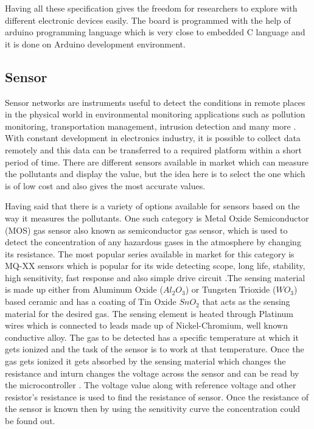 Having all these specification gives the freedom for researchers to explore with different electronic devices easily. The board is programmed with the help of arduino programming language which is very close to embedded C language and it is done on Arduino development environment. 

\subsection{Sensor}

Sensor networks are instruments useful to detect the conditions in remote places in the physical world in environmental monitoring applications such as pollution monitoring, transportation management, intrusion detection and many more \cite{Jung2011}. With constant development in electronics industry, it is possible to collect data remotely and this data can be transferred to a required platform within a short period of time.
There are different sensors available in market which can measure the pollutants and display the value, but the idea here is to select the one which is of low cost and also gives the most accurate values.
\par
Having said that there is a variety of options available for sensors based on the way it measures the pollutants. One such category is Metal Oxide Semiconductor (MOS) gas sensor also known as semiconductor gas sensor, which is used to detect the concentration of any hazardous gases in the atmosphere by changing its resistance. The most popular series available in market for this category is MQ-XX sensors which is popular for its wide detecting scope, long life, stability, high sensitivity, fast response and also simple drive circuit \cite{Data2012}.The sensing material is made up either from Aluminum Oxide ($ Al_{2}O_{3}$) or Tungsten Trioxide ($WO_3$) based ceramic and has a coating of Tin Oxide $ SnO_{2} $ that acts as the sensing material for the desired gas. The sensing element is heated through Platinum wires which is connected to leads made up of Nickel-Chromium, well known conductive alloy. The gas to be detected has a specific temperature at which it gets ionized and the task of the sensor is to work at that temperature. Once the gas gets ionized it gets absorbed by the sensing material which changes the resistance and inturn changes the voltage across the sensor and can be read by the microcontroller \cite{gassensor}. The voltage value along with reference voltage and other resistor's resistance is used to find the resistance of sensor. Once the resistance of the sensor is known then by using the sensitivity curve the concentration could be found out. 

